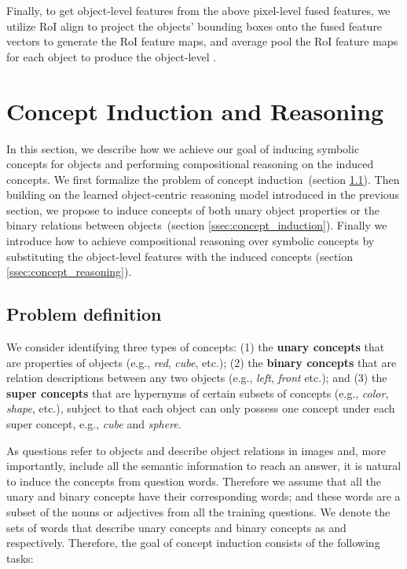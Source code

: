\documentclass[final]{cvpr}
\begin{document}
Finally, to get object-level features from the above pixel-level fused features, we utilize RoI align \cite{he2017mask} to project the objects' bounding boxes onto the fused feature vectors to generate the RoI feature maps, and average pool the RoI feature maps for each object to produce the object-level .
\vspace{-3mm}


\section{Concept Induction and Reasoning}
\label{sec:concept_induction}

In this section, we describe how we achieve our goal of inducing symbolic concepts for objects and performing compositional reasoning on the induced concepts. 
We first formalize the problem of concept induction~(section \ref{ssec:concept_formulation}).
Then building on the learned object-centric reasoning model introduced in the previous section, we propose to induce concepts of both unary object properties or the binary relations between objects~(section \ref{ssec:concept_induction}). Finally we introduce how to achieve compositional reasoning over symbolic concepts by substituting the object-level features with the induced concepts (section \ref{ssec:concept_reasoning}). 

\subsection{Problem definition}
\label{ssec:concept_formulation}
We consider identifying three types of concepts: (1) the \textbf{unary concepts}  that are properties of objects (e.g., \emph{red}, \emph{cube}, etc.); (2) the \textbf{binary concepts}  that are relation descriptions between any two objects (e.g., \emph{left}, \emph{front} etc.); and (3) the \textbf{super concepts}  that are hypernyms of certain subsets of concepts (e.g., \emph{color}, \emph{shape}, etc.), subject to that each object can only possess one concept under each super concept, e.g., \emph{cube} and \emph{sphere}.

As questions refer to objects and describe object relations in images and, more importantly, include all the semantic information to reach an answer, it is natural to induce the concepts from question words. Therefore we assume that all the unary and binary concepts have their corresponding words; and these words are a subset of the nouns or adjectives from all the training questions. We denote the sets of words that describe unary concepts and binary concepts as  and  respectively. Therefore, the goal of concept induction consists of the following tasks:
\end{document}
